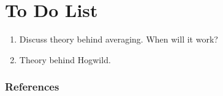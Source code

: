 \documentclass{article} %
\begin{document}
\section{To Do List}
\begin{enumerate}
\item Discuss theory behind averaging. When will it work?
\item Theory behind Hogwild.
\end{enumerate}


\subsubsection*{References}

\begingroup
\renewcommand{\section}[2]{}%


\endgroup
\end{document}
